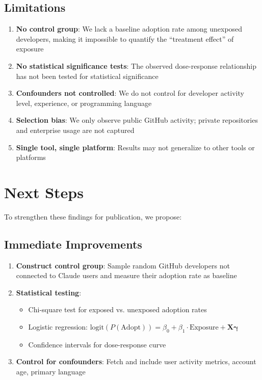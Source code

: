 \documentclass[11pt]{article}
\begin{document}
\subsection{Limitations}

\begin{enumerate}
    \item \textbf{No control group}: We lack a baseline adoption rate among unexposed developers, making it impossible to quantify the ``treatment effect'' of exposure

    \item \textbf{No statistical significance tests}: The observed dose-response relationship has not been tested for statistical significance

    \item \textbf{Confounders not controlled}: We do not control for developer activity level, experience, or programming language

    \item \textbf{Selection bias}: We only observe public GitHub activity; private repositories and enterprise usage are not captured

    \item \textbf{Single tool, single platform}: Results may not generalize to other tools or platforms
\end{enumerate}

\section{Next Steps}

To strengthen these findings for publication, we propose:

\subsection{Immediate Improvements}

\begin{enumerate}
    \item \textbf{Construct control group}: Sample random GitHub developers not connected to Claude users and measure their adoption rate as baseline

    \item \textbf{Statistical testing}:
    \begin{itemize}
        \item Chi-square test for exposed vs. unexposed adoption rates
        \item Logistic regression: $\text{logit}(P(\text{Adopt})) = \beta_0 + \beta_1 \cdot \text{Exposure} + \mathbf{X}\boldsymbol{\gamma}$
        \item Confidence intervals for dose-response curve
    \end{itemize}

    \item \textbf{Control for confounders}: Fetch and include user activity metrics, account age, primary language
\end{enumerate}
\end{document}
